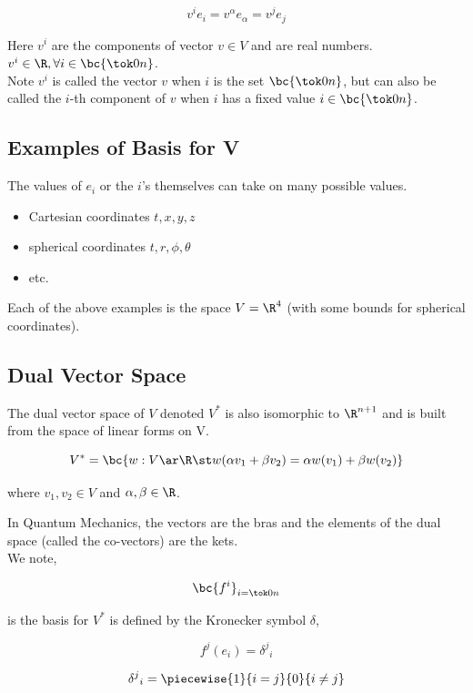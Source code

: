 \documentclass{article}
\begin{document}
\[ v^ie_i = v^{\alpha}e_{\alpha} = v^je_j \]

Here $v^i$ are the components of vector $v \in V$ and are real numbers. $v^i \in \R, \forall i \in \bc{\tok0n}$. \\

Note $v^i$ is called the vector $v$ when $i$ is the set $\bc{\tok0n}$, but can also be called the $i$-th component of $v$ when $i$ has a fixed value $i \in \bc{\tok0n}$. \\

\subsection{Examples of Basis for V}

The values of $e_i$ or the $i$'s themselves can take on many possible values.

\begin{itemize}
    \item Cartesian coordinates $t,x,y,z$
    \item spherical coordinates $t, r, \phi, \theta$
    \item etc.
\end{itemize}

Each of the above examples is the space $V = \R^4$ (with some bounds for spherical coordinates).

\subsection{Dual Vector Space}

The dual vector space of $V$ denoted $V^*$ is also isomorphic to $\R^{n+1}$ and is built from the space of linear forms on V.

\[ V^* = \bc{w: V \ar \R \st w(\alpha v_1 + \beta v_2) = \alpha w( v_1) + \beta w(v_2)} \]

where $v_1, v_2 \in V$ and $\alpha, \beta \in \R$.

In Quantum Mechanics, the vectors are the bras and the elements of the dual space (called the co-vectors) are the kets. \\

We note,

\[ \bc{f^i}_{i=\tok0n} \]

is the basis for $V^*$ is defined by the Kronecker symbol $\delta$,

\[ f^j(e_i) = {\delta^j}_i \]

\[ {\delta^j}_i = \piecewise{1}{i=j}{0}{i\neq j} \]
\end{document}
